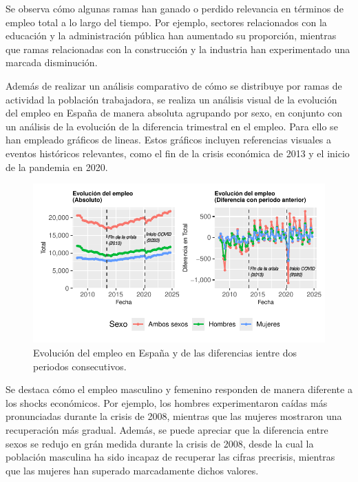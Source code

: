 \documentclass[Universitat de
València,article,submit,moreauthors,pdftex]{Definitions/mdpi}
\begin{document}
Se observa cómo algunas ramas han ganado o perdido relevancia en
términos de empleo total a lo largo del tiempo. Por ejemplo, sectores
relacionados con la educación y la administración pública han aumentado
su proporción, mientras que ramas relacionadas con la construcción y la
industria han experimentado una marcada disminución.

Además de realizar un análisis comparativo de cómo se distribuye por
ramas de actividad la población trabajadora, se realiza un análisis
visual de la evolución del empleo en España de manera absoluta agrupando
por sexo, en conjunto con un análisis de la evolución de la diferencia
trimestral en el empleo. Para ello se han empleado gráficos de lineas.
Estos gráficos incluyen referencias visuales a eventos históricos
relevantes, como el fin de la crisis económica de 2013 y el inicio de la
pandemia en 2020.

\begin{figure}

{\centering \includegraphics{ProyectoAED2024_files/figure-latex/unnamed-chunk-39-1} 

}

\caption{Evolución del empleo en España y de las diferencias ientre dos periodos consecutivos.}\label{fig:unnamed-chunk-39}
\end{figure}

Se destaca cómo el empleo masculino y femenino responden de manera
diferente a los shocks económicos. Por ejemplo, los hombres
experimentaron caídas más pronunciadas durante la crisis de 2008,
mientras que las mujeres mostraron una recuperación más gradual. Además,
se puede apreciar que la diferencia entre sexos se redujo en grán medida
durante la crisis de 2008, desde la cual la población masculina ha sido
incapaz de recuperar las cifras precrisis, mientras que las mujeres han
superado marcadamente dichos valores.
\end{document}
